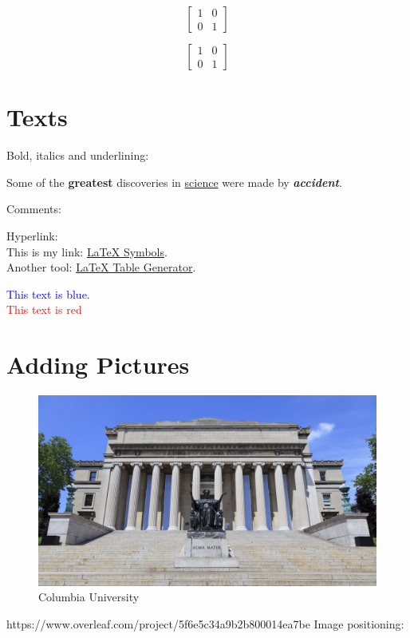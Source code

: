 \documentclass[12pt,fullpagea4paper,a4paper,doublespace]{article}
\begin{document}
$$[
\begin{matrix}
1 & 0\\
0 & 1
\end{matrix}
]$$

$$\left[
\begin{matrix}
1 & 0\\
0 & 1
\end{matrix}
\right]$$

\section{Texts}

Bold, italics and underlining:

\noindent Some of the \textbf{greatest} discoveries in \underline{science}  were made by \textbf{\textit{accident}}.


Comments:

Hyperlink:\\
This is my link: \href{https://artofproblemsolving.com/wiki/index.php/LaTeX:Symbols}{LaTeX Symbols}.\\
Another tool: \href{https://www.tablesgenerator.com/}{LaTeX Table Generator}.

    
\noindent    \textcolor{blue}{This text is blue.}\\
    \textcolor{red}{This text is red}
    
    
\section{Adding Pictures}

\begin{figure}[h!]
  \includegraphics[width=\linewidth]{cu.jpg}
  \caption{Columbia University} 
\end{figure}
https://www.overleaf.com/project/5f6e5c34a9b2b800014ea7be
Image positioning: 
\end{document}
